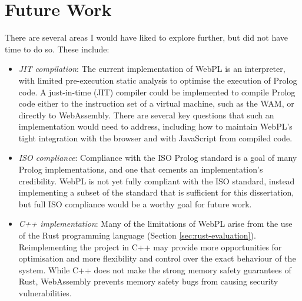 \section{Future Work}

There are several areas I would have liked to explore further, but did not have time to do so. These include:

\begin{itemize}
\item \emph{JIT compilation}: The current implementation of WebPL is an interpreter, with limited pre-execution static analysis to optimise the execution of Prolog code. A just-in-time (JIT) compiler could be implemented to compile Prolog code either to the instruction set of a virtual machine, such as the WAM, or directly to WebAssembly. There are several key questions that such an implementation would need to address, including how to maintain WebPL's tight integration with the browser and with JavaScript from compiled code.
\item \emph{ISO compliance}: Compliance with the ISO Prolog standard \cite{isoInformationtechnologyProgramming1995} is a goal of many Prolog implementations, and one that cements an implementation's credibility. WebPL is not yet fully compliant with the ISO standard, instead implementing a subset of the standard that is sufficient for this dissertation, but full ISO compliance would be a worthy goal for future work.
\item \emph{C++ implementation}: Many of the limitations of WebPL arise from the use of the Rust programming language (Section \ref{sec:rust-evaluation}). Reimplementing the project in C++ may provide more opportunities for optimisation and more flexibility and control over the exact behaviour of the system. While C++ does not make the strong memory safety guarantees of Rust, WebAssembly prevents memory safety bugs from causing security vulnerabilities.
\end{itemize}